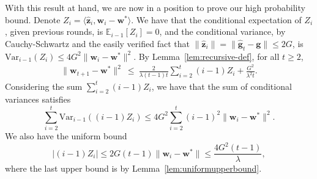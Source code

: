 \documentclass{article}
\newcommand{\E}{\mathbb{E}}
\newcommand{\var}{\text{Var}}
\newcommand{\bw}{\mathbf{w}}
\newcommand{\bz}{\mathbf{z}}
\newcommand{\bg}{\mathbf{g}}
\newcommand{\norm}[1]{\|#1\|}
\newcommand{\inner}[1]{\langle#1\rangle}
\newcommand{\lemref}[1]{Lemma~\ref{#1}}
\begin{document}
With this result at hand, we are now in a position to prove our high probability bound. Denote $Z_i = \inner{\hat{\bz}_i,\bw_i-\bw^{*}}$. We have that the conditional expectation of $Z_i$, given previous rounds, is $\E_{i-1}[Z_i]  = 0$, and the conditional variance, by Cauchy-Schwartz and the easily verified fact that $\norm{\hat{\bz}_i}=\norm{\hat{\bg}_t-\bg} \leq 2G$, is $\var_{i-1}(Z_i) \leq 4G^2\norm{\bw_i-\bw^*}^2$. By Lemma~\ref{lem:recursive-def}, for all $t\geq 2$,
	\begin{align}
		\label{eq:recurse}
	\norm{\bw_{t+1}-\bw^*}^2 ~\leq~ \frac{2}{\lambda(t-1)t}\sum_{i= 2}^{t}(i-1)Z_i+\frac{G^2}{\lambda^2 t}.
	\end{align}
Considering the sum $\sum_{i=2}^{t}(i-1)Z_i$, we have that the sum of conditional variances satisfies
\[
\sum_{i=2}^t\var_{i-1}((i-1)Z_i) \leq 4G^2 \sum_{i=2}^t (i-1)^2 \norm{\bw_i-\bw^*}^2.
\]
We also have the uniform bound
\begin{equation}\label{eq:domainbound}
|(i-1)Z_i| \leq 2G(t-1) \norm{\bw_i-\bw^*} \leq \frac{4G^2(t-1)}{\lambda},
\end{equation}
where the last upper bound is by \lemref{lem:uniformupperbound}.
\end{document}
